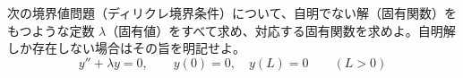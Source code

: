 
次の境界値問題（ディリクレ境界条件）について、自明でない解（固有関数）をもつような定数 $\lambda$（固有値）をすべて求め、対応する固有関数を求めよ。自明解しか存在しない場合はその旨を明記せよ。
\[
y'' + \lambda y = 0, \qquad y(0) = 0, \quad y(L) = 0 \qquad (L > 0)
\]
